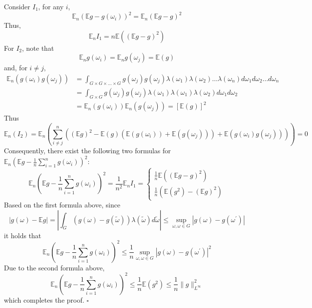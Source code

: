 \documentclass[10pt]{article}
\begin{document}
Consider $I_{1}$, for any $i$,
$$
\mathbb{E}_{n}\left(\mathbb{E} g-g\left(\omega_{i}\right)\right)^{2}=\mathbb{E}_{n}(\mathbb{E} g-g)^{2}
$$
Thus,
$$
\mathbb{E}_{n} I_{1}=n \mathbb{E}\left((\mathbb{E} g-g)^{2}\right)
$$
For $I_{2}$, note that
$$
\mathbb{E}_{n} g\left(\omega_{i}\right)=\mathbb{E}_{n} g\left(\omega_{j}\right)=\mathbb{E}(g)
$$
and, for $i \neq j$,
$$
\begin{aligned}
\mathbb{E}_{n}\left(g\left(\omega_{i}\right) g\left(\omega_{j}\right)\right) &=\int_{G \times G \times \ldots \times G} g\left(\omega_{j}\right) g\left(\omega_{j}\right) \lambda\left(\omega_{1}\right) \lambda\left(\omega_{2}\right) \ldots \lambda\left(\omega_{n}\right) d \omega_{1} d \omega_{2} \ldots d \omega_{n} \\
&=\int_{G \times G} g\left(\omega_{j}\right) g\left(\omega_{j}\right) \lambda\left(\omega_{1}\right) \lambda\left(\omega_{1}\right) \lambda\left(\omega_{2}\right) d \omega_{1} d \omega_{2} \\
&=\mathbb{E}_{n}\left(g\left(\omega_{i}\right)\right) \mathbb{E}_{n}\left(g\left(\omega_{j}\right)\right)=[\mathbb{E}(g)]^{2}
\end{aligned}
$$
Thus
$$
\mathbb{E}_{n}\left(I_{2}\right)=\mathbb{E}_{n}\left(\sum_{i \neq j}^{n}\left((\mathbb{E} g)^{2}-\mathbb{E}(g)\left(\mathbb{E}\left(g\left(\omega_{i}\right)\right)+\mathbb{E}\left(g\left(\omega_{j}\right)\right)\right)+\mathbb{E}\left(g\left(\omega_{i}\right) g\left(\omega_{j}\right)\right)\right)\right)=0
$$
Consequently, there exist the following two formulas for $\mathbb{E}_{n}\left(\mathbb{E} g-\frac{1}{n} \sum_{i=1}^{n} g\left(\omega_{i}\right)\right)^{2}:$
$$
\mathbb{E}_{n}\left(\mathbb{E} g-\frac{1}{n} \sum_{i=1}^{n} g\left(\omega_{i}\right)\right)^{2}=\frac{1}{n^{2}} \mathbb{E}_{n} I_{1}=\left\{\begin{array}{c}
\frac{1}{n} \mathbb{E}\left((\mathbb{E} g-g)^{2}\right) \\
\frac{1}{n}\left(\mathbb{E}\left(g^{2}\right)-(\mathbb{E} g)^{2}\right)
\end{array}\right.
$$
Based on the first formula above, since
$$
|g(\omega)-\mathbb{E} g|=\left|\int_{G}(g(\omega)-g(\tilde{\omega})) \lambda(\tilde{\omega}) d \tilde{\omega}\right| \leq \sup _{\omega, \omega \in G}\left|g(\omega)-g\left(\omega^{\prime}\right)\right|
$$
it holds that
$$
\mathbb{E}_{n}\left(\mathbb{E} g-\frac{1}{n} \sum_{i=1}^{n} g\left(\omega_{i}\right)\right)^{2} \leq \frac{1}{n} \sup _{\omega, \omega \in G}\left|g(\omega)-g\left(\omega^{\prime}\right)\right|^{2}
$$
Due to the second formula above,
$$
\mathbb{E}_{n}\left(\mathbb{E} g-\frac{1}{n} \sum_{i=1}^{n} g\left(\omega_{i}\right)\right)^{2} \leq \frac{1}{n} \mathbb{E}\left(g^{2}\right) \leq \frac{1}{n}\|g\|_{L^{\infty}}^{2}
$$
which completes the proof. $\square$
\end{document}
